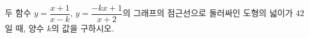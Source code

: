 \hspace*{2mm}\begin{minipage}[t]{\dimexpr\linewidth-2mm\relax}\vspace{0pt}
두 함수 $y=\dfrac{x+1}{x-k}$, $y=\dfrac{-kx+1}{x+2}$의 그래프의 점근선으로 둘러싸인 도형의 넓이가 $42$일 때, 양수 $k$의 값을 구하시오.\end{minipage}
